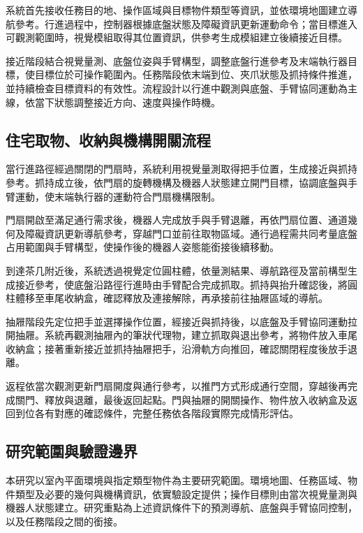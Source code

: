 系統首先接收任務目的地、操作區域與目標物件類型等資訊，並依環境地圖建立導航參考。行進過程中，控制器根據底盤狀態及障礙資訊更新運動命令；當目標進入可觀測範圍時，視覺模組取得其位置資訊，供參考生成模組建立後續接近目標。

接近階段結合視覺量測、底盤位姿與手臂構型，調整底盤行進參考及末端執行器目標，使目標位於可操作範圍內。任務階段依末端到位、夾爪狀態及抓持條件推進，並持續檢查目標資料的有效性。流程設計以行進中觀測與底盤、手臂協同運動為主線，依當下狀態調整接近方向、速度與操作時機。

\subsection{住宅取物、收納與機構開關流程}
\label{subsec:door_traversal_retrieval_return}

當行進路徑經過關閉的門扇時，系統利用視覺量測取得把手位置，生成接近與抓持參考。抓持成立後，依門扇的旋轉機構及機器人狀態建立開門目標，協調底盤與手臂運動，使末端執行器的運動符合門扇機構限制。

門扇開啟至滿足通行需求後，機器人完成放手與手臂退離，再依門扇位置、通道幾何及障礙資訊更新導航參考，穿越門口並前往取物區域。通行過程需共同考量底盤占用範圍與手臂構型，使操作後的機器人姿態能銜接後續移動。

到達茶几附近後，系統透過視覺定位圓柱體，依量測結果、導航路徑及當前構型生成接近參考，使底盤沿路徑行進時由手臂配合完成抓取。抓持與抬升確認後，將圓柱體移至車尾收納盒，確認釋放及連接解除，再承接前往抽屜區域的導航。

抽屜階段先定位把手並選擇操作位置，經接近與抓持後，以底盤及手臂協同運動拉開抽屜。系統再觀測抽屜內的筆狀代理物，建立抓取與退出參考，將物件放入車尾收納盒；接著重新接近並抓持抽屜把手，沿滑軌方向推回，確認關閉程度後放手退離。

返程依當次觀測更新門扇開度與通行參考，以推門方式形成通行空間，穿越後再完成關門、釋放與退離，最後返回起點。門與抽屜的開關操作、物件放入收納盒及返回到位各有對應的確認條件，完整任務依各階段實際完成情形評估。

\subsection{研究範圍與驗證邊界}
\label{subsec:research_scope_validation_boundaries}

本研究以室內平面環境與指定類型物件為主要研究範圍。環境地圖、任務區域、物件類型及必要的幾何與機構資訊，依實驗設定提供；操作目標則由當次視覺量測與機器人狀態建立。研究重點為上述資訊條件下的預測導航、底盤與手臂協同控制，以及任務階段之間的銜接。

